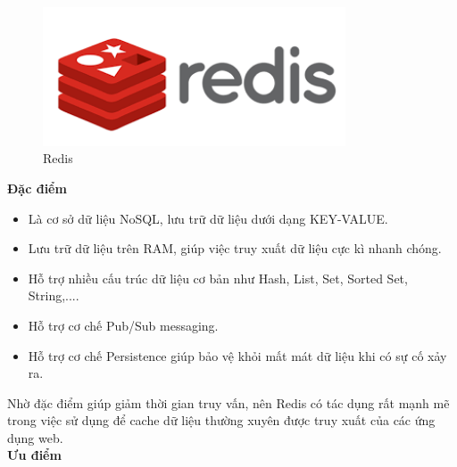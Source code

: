             \begin{figure}[H]   			
            	\includegraphics[width=0.8\textwidth]{Images/redis.png}
            	\centering
            	\linebreak
            	\caption{Redis\cite{Redis}} 
            \end{figure}
            
            
            \textbf{Đặc điểm}
            
            \begin{itemize}
                \item Là cơ sở dữ liệu NoSQL, lưu trữ dữ liệu dưới dạng KEY-VALUE.
                \item Lưu trữ dữ liệu trên RAM, giúp việc truy xuất dữ liệu cực kì nhanh chóng.
                \item Hỗ trợ nhiều cấu trúc dữ liệu cơ bản như Hash, List, Set, Sorted Set, String,....
                \item Hỗ trợ cơ chế Pub/Sub messaging.
                \item Hỗ trợ cơ chế Persistence giúp bảo vệ khỏi mất mát dữ liệu khi có sự cố xảy ra.
            \end{itemize}
            
            Nhờ đặc điểm giúp giảm thời gian truy vấn, nên Redis có tác dụng rất mạnh mẽ trong việc sử dụng để cache dữ liệu thường xuyên được truy xuất của các ứng dụng web.\\ 
            
            \textbf{Ưu điểm}
            
